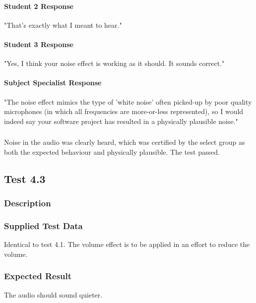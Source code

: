 \paragraph{Student 2 Response}
"That's exactly what I meant to hear."

\paragraph{Student 3 Response}
"Yes, I think your noise effect is working as it should. It sounds correct."

\paragraph{Subject Specialist Response}
"The noise effect mimics the type of 'white noise' often picked-up by poor quality microphones (in which all frequencies are more-or-less represented), so I would indeed say your software project has resulted in a physically plausible noise."

\subsubsection{}
Noise in the audio was clearly heard, which was certified by the select group as both the expected behaviour and physically plausible. The test passed.


\pagebreak
\subsection{Test 4.3}
\subsubsection{Description}
\paragraph{}
{
	\centering
}

\subsubsection{Supplied Test Data}
Identical to test 4.1. The volume effect is to be applied in an effort to reduce the volume.

\subsubsection{Expected Result}
The audio should sound quieter.

